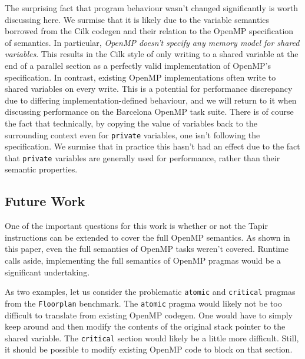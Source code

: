 \documentclass[sigconf]{acmart}
\begin{document}
The surprising fact that program behaviour wasn't changed significantly is
worth discussing here. We surmise that it is likely due to the variable
semantics borrowed from the Cilk codegen and their relation to the OpenMP
specification of semantics. In particular, \emph{OpenMP doesn't specify any
memory model for shared variables}. This results in the Cilk style of only
writing to a shared variable at the end of a parallel section as a perfectly
valid implementation of OpenMP's specification. In contrast, existing OpenMP
implementations often write to shared variables on every write. This is a
potential for performance discrepancy due to differing implementation-defined
behaviour, and we will return to it when discussing performance on the
Barcelona OpenMP task suite. There is of course the fact that technically, by
copying the value of variables back to the surrounding context even for
\texttt{private} variables, one isn't following the specification. We surmise
that in practice this hasn't had an effect due to the fact that
\texttt{private} variables are generally used for performance, rather than
their semantic properties. 

\subsection{Future Work} \label{Sec:Future}

One of the important questions for this work is whether or not the Tapir
instructions can be extended to cover the full OpenMP semantics. As shown
in this paper, even the full semantics of OpenMP tasks weren't covered. Runtime
calls aside, implementing the full semantics of OpenMP pragmas would be a 
significant undertaking.

As two examples, let us consider the problematic \texttt{atomic} and
\texttt{critical} pragmas from the \texttt{Floorplan} benchmark. The 
\texttt{atomic} pragma would likely not be too difficult to translate
from existing OpenMP codegen. One would have to simply keep around and then
modify the contents of the original stack pointer to the shared variable. The
\texttt{critical} section would likely be a little more difficult. Still, it
should be possible to modify existing OpenMP code to block on that section. 
\end{document}
